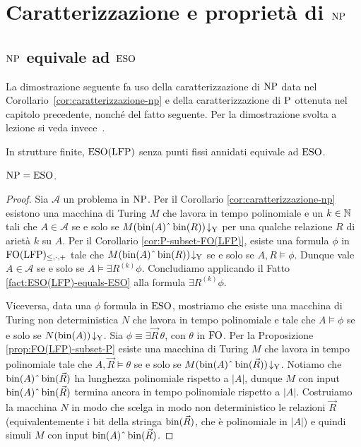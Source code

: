 \chapter{Caratterizzazione e proprietà di \texorpdfstring{$\NP$}{NP}}

\section{\texorpdfstring{$\NP$}{NP} equivale ad \texorpdfstring{$\ESO$}{ESO}}

La dimostrazione seguente fa uso della caratterizzazione di $\NP$ data
nel Corollario~\ref{cor:caratterizzazione-np} e della caratterizzazione di $\P$
ottenuta nel capitolo precedente, nonché del fatto seguente. Per la dimostrazione
svolta a lezione si veda invece~\cite[7.2]{immerman1999descriptive}.
\begin{fatto}
\label{fact:ESO(LFP)-equals-ESO}
 In strutture finite, $\ESO(\LFP)$ senza punti fissi annidati equivale ad $\ESO$.
\end{fatto}

\begin{teorema}[Fagin]
  \label{thm:np-eso}
  $\NP = \ESO$.
\end{teorema}
\begin{proof}
 Sia $\mathcal{A}$ un problema in $\NP$. Per il Corollario \ref{cor:caratterizzazione-np}
 esistono una macchina di Turing $M$ che lavora in tempo polinomiale e un $k \in \N$ tali che
 $A \in \mathcal{A}$ se e solo se $M(\bin(A)\string^\bin(R))\accepts$ per una qualche
 relazione $R$ di arietà $k$ su $A$.
 Per il Corollario \ref{cor:P-subset-FO(LFP)}, esiste una formula $\phi$
 in $\FOLFP$ tale che $M(\bin(A)\string^\bin(R))\accepts$ se e solo se
 $A,R \models \phi$. Dunque vale $A \in \mathcal{A}$ se e solo se
 $A \models \exists R^{(k)} \phi$. Concludiamo applicando il 
 Fatto \ref{fact:ESO(LFP)-equals-ESO} alla formula $\exists R^{(k)} \phi$.
 
 Viceversa, data una $\phi$ formula in $\ESO$, mostriamo che esiste una macchina
 di Turing non deterministica $N$ che lavora in tempo polinomiale e
 tale che $A \models \phi$ se e solo se $N(\bin(A))\accepts$.
 Sia $\phi \equiv \exists \vec{R}\,\theta$, con $\theta$ in $\FO$.
 Per la Proposizione \ref{prop:FO(LFP)-subset-P} esiste una macchina di Turing
 $M$ che lavora in tempo polinomiale tale che $A,\vec{R} \models \theta$
 se e solo se $M(\bin(A)\string^\bin(\vec{R}))\accepts$.
 Notiamo che $\bin(A)\string^\bin(\vec{R})$ ha lunghezza polinomiale
 rispetto a $|A|$, dunque $M$ con input $\bin(A)\string^\bin(\vec{R})$ termina ancora
 in tempo polinomiale rispetto a $|A|$. Costruiamo la macchina $N$
 in modo che scelga
 in modo non deterministico le relazioni $\vec{R}$ (equivalentemente i bit
 della stringa $\bin(\vec{R})$, che è polinomiale in $|A|$) e quindi simuli
 $M$ con input $\bin(A)\string^\bin(\vec{R})$.
\end{proof}


